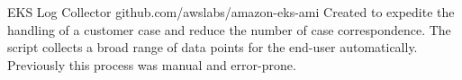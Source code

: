 \projectitem
    {EKS Log Collector}
    {github.com/awslabs/amazon-eks-ami}
    {Created to expedite the handling of a customer case and reduce the number of case correspondence. The script collects a broad range of data points for the end-user automatically. Previously this process  was manual and error-prone.}